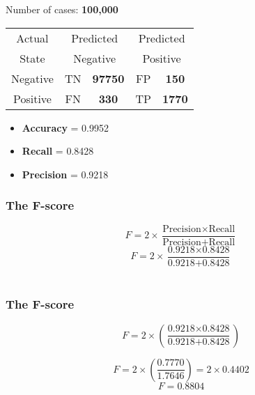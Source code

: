 \documentclass{beamer}
\begin{document}
\begin{frame}
\Large
Number of cases: \textbf{100,000}\\ 
\begin{center}

\begin{table}[!htbp]
\begin{tabular}{c *4c}
\toprule
Actual &  \multicolumn{2}{c}{Predicted} & \multicolumn{2}{c}{Predicted}\\
State &  \multicolumn{2}{c}{Negative} & \multicolumn{2}{c}{Positive}\\
\midrule
Negative   & \phantom{spa} TN & \textbf{97750}\phantom{spa}   & FP  & \textbf{150}\\
Positive   & \phantom{spa} FN & \textbf{330} \phantom{spa}   & TP  & \textbf{1770}\\

\bottomrule
\end{tabular}
\end{table}
\end{center}
\begin{itemize}
\item \textbf{Accuracy} = 0.9952
\item \textbf{Recall} = 0.8428
\item \textbf{Precision} = 0.9218
\end{itemize}
\end{frame}
\begin{frame}
\frametitle{The F-score}
\LARGE
\[ F = 2 \times \frac{\mbox{Precision} \times \mbox{Recall}}{\mbox{Precision} + \mbox{Recall}}\]\bigskip
\[ F = 2 \times \frac{\mbox{0.9218} \times \mbox{0.8428}}{\mbox{0.9218} + \mbox{0.8428}}\] 
\bigskip
\phantom{STUFF}\\
\bigskip
\phantom{STUFF}
\end{frame}

\begin{frame}
\frametitle{The F-score}
\LARGE


\[ F = 2 \times \left( \frac{\mbox{0.9218} \times \mbox{0.8428}}{\mbox{0.9218} + \mbox{0.8428}} \right)\] 

\[ F = 2 \times \left( \frac{0.7770}{1.7646} \right) = 2 \times 0.4402 \]
{
\huge
\[F = 0.8804\] 
}
\end{frame}
\end{document}

